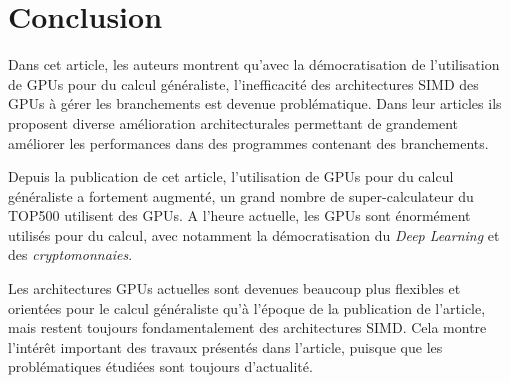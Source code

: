 \documentclass[11pt]{article}
\begin{document}
\section{Conclusion}

Dans cet article, les auteurs montrent qu'avec la démocratisation de l'utilisation de GPUs pour du calcul généraliste, l'inefficacité des architectures SIMD des GPUs à gérer les branchements est devenue problématique.
Dans leur articles ils proposent diverse amélioration architecturales permettant de grandement améliorer les performances dans des programmes contenant des branchements.

Depuis la publication de cet article, l'utilisation de GPUs pour du calcul généraliste a fortement augmenté, un grand nombre de super-calculateur du TOP500 utilisent des GPUs.
A l'heure actuelle, les GPUs sont énormément utilisés pour du calcul, avec notamment la démocratisation du \emph{Deep Learning} et des \emph{cryptomonnaies}. 

Les architectures GPUs actuelles sont devenues beaucoup plus flexibles et orientées pour le calcul généraliste qu'à l'époque de la publication de l'article, mais restent toujours fondamentalement des architectures SIMD.
Cela montre l'intérêt important des travaux présentés dans l'article, puisque que les problématiques étudiées sont toujours d'actualité.
\end{document}
